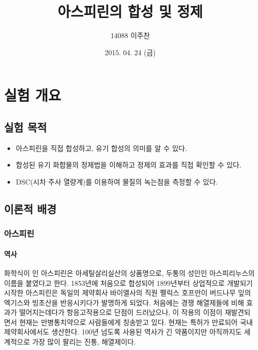\documentclass{GSHS-chemexp}
\begin{document}
	
	\title{아스피린의 합성 및 정제}	
	\date{2015. 04. 24 (금)}
	\author{14088 이주찬}
	\maketitle
	
	\section{실험 개요}
	
	\subsection{실험 목적}
	\begin{itemize}
		\item 아스피린을 직접 합성하고, 유기 합성의 의미를 알 수 있다.
		\item 합성된 유기 화합물의 정제법을 이해하고 정제의 효과를
		직접 확인할 수 있다.
		\item DSC(시차 주사 열량계)를 이용하여 물질의 녹는점을 측정할 수 있다.
	\end{itemize}
	
	\subsection{이론적 배경}
	
	\subsubsection{아스피린}
	
	\paragraph{역사}
	화학식이 인 아스피린은 아세틸살리실산의 상품명으로,
	두통의 성인인 아스피리누스의 이름을 붙였다고 한다.
	1853년에 처음으로 합성되어 1899년부터 상업적으로 개발되기 시작한 아스피린은
	독일의 제약회사 바이엘사의 직원 펠릭스 호프만이
	버드나무 잎의 엑기스와 빙초산을 반응시키다가 발명하게 되었다.
	처음에는 경쟁 해열제들에 비해 효과가 떨어지는데다가
	항응고작용으로 단점이 드러났으나,
	이 작용의 이점이 재발견되면서
	현재는 만병통치약으로 사람들에게 칭송받고 있다.
	현재는 특허가 만료되어 국내 제약회사에서도 생산한다.
	100년 넘도록 사용된 역사가 긴 약품이지만
	아직까지도 세계적으로 가장 많이 팔리는 진통, 해열제이다.
	
\end{document}
